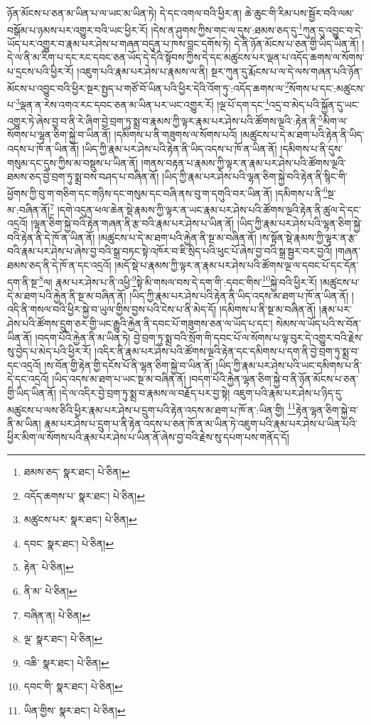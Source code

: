 ཉོན་མོངས་པ་ཅན་མ་ཡིན་པ་ལ་ཡང་མ་ཡིན་ཏེ། དེ་དང་འགལ་བའི་ཕྱིར་ན། ཆེ་ཆུང་གི་རིམ་པས་སྦྱོར་བའི་ལམ་བསྒོམ་པ་ཉམས་པར་འགྱུར་བའི་ཡང་ཕྱིར་རོ། །དེས་ན་ཤུགས་ཀྱིས་གང་ལ་དུས་:ཐམས་ཅད་དུ་\footnote{ཐམས་ཅད་  སྣར་ཐང་།  པེ་ཅིན། }ཀུན་དུ་འབྱུང་བ་དེ་ཡོད་པར་འགྱུར་བ་རྣམ་པར་ཤེས་པ་གཞན་བདུན་པ་ཁས་བླང་དགོས་ཏེ། དེ་ནི་ཉོན་མོངས་པ་ཅན་གྱི་ཡིད་ཡིན་ནོ། །དེ་ལ་ནི་མ་རིག་པ་དང་རང་དབང་ཅན་ཡོད་དེ་དེའི་སྟོབས་ཀྱིས་དེ་དང་མཚུངས་པར་ལྡན་པ་འདོད་ཆགས་ལ་སོགས་པ་དྲངས་པའི་ཕྱིར་རོ། །འཇུག་པའི་རྣམ་པར་ཤེས་པ་རྣམས་ལ་ནི། སྔར་ཀུན་དུ་རྨོངས་པ་ལ་དེ་ལས་གཞན་པའི་ཉོན་མོངས་པ་འབྱུང་བའི་ཕྱིར་སྔར་སྤྱད་པ་གཙོ་བོ་ཡིན་པའི་ཕྱིར་དེའི་འོག་ཏུ་:འདོད་ཆགས་ལ་\footnote{འདོད་ཆགས་པ་  སྣར་ཐང་།  པེ་ཅིན། }སོགས་པ་དང་:མཚུངས་པ་\footnote{མཚུངས་པར་  སྣར་ཐང་།  པེ་ཅིན། }ལྡན་ན་རེས་འགའ་རང་དབང་ཅན་མ་ཡིན་པར་ཡང་འགྱུར་རོ། །ལྔ་པོ་དག་དང་\footnote{དབང་  སྣར་ཐང་།  པེ་ཅིན། }འདྲ་བ་མེད་པའི་སྐྱོན་དུ་ཡང་འགྱུར་ཏེ་ཞེས་བྱ་བ་ནི་རེ་ཞིག་བྱེ་བྲག་ཏུ་སྨྲ་བ་རྣམས་ཀྱི་ལྟར་རྣམ་པར་ཤེས་པའི་ཚོགས་ལྔའི་:རྟེན་ནི་\footnote{རྟེན་  པེ་ཅིན། }མིག་ལ་སོགས་པ་ལྷན་ཅིག་སྐྱེ་བ་ཡིན་ནོ། །དམིགས་པ་ནི་གཟུགས་ལ་སོགས་པའོ། །མཚུངས་པ་དེ་མ་ཐག་པའི་རྟེན་ནི་ཡིད་འདས་པ་ཁོ་ན་ཡིན་ནོ། །ཡིད་ཀྱི་རྣམ་པར་ཤེས་པའི་རྟེན་ནི་ཡིད་འདས་པ་ཁོ་ན་ཡིན་ནོ། །དམིགས་པ་ནི་དུས་གསུམ་དང་དུས་ཀྱིས་མ་བསྡུས་པ་ཡིན་ནོ། །གནས་བརྟན་པ་རྣམས་ཀྱི་ལྟར་ན་རྣམ་པར་ཤེས་པའི་ཚོགས་ལྔའི་ཐམས་ཅད་བྱེ་བྲག་ཏུ་སྨྲ་བས་བཤད་པ་བཞིན་ནོ། །ཡིད་ཀྱི་རྣམ་པར་ཤེས་པའི་ལྷན་ཅིག་སྐྱེ་བའི་རྟེན་ནི་སྙིང་གི་ཕྱོགས་ཀྱི་བུ་ག་གཅིག་དང་གཉིས་དང་གསུམ་དང་བཞི་ནས་བུ་ག་དགུའི་བར་ཡིན་ནོ། །དམིགས་པ་ནི་\footnote{ནི་མ་  པེ་ཅིན། }སྔ་མ་:བཞིན་ནོ།\footnote{བཞིན་ན།  པེ་ཅིན། } །དགེ་འདུན་ཕལ་ཆེན་སྡེ་རྣམས་ཀྱི་ལྟར་ན་ཡང་རྣམ་པར་ཤེས་པའི་ཚོགས་ལྔའི་རྟེན་ནི་ཚུལ་དེ་དང་འདྲའོ། །ལྷན་ཅིག་སྐྱེ་བའི་རྟེན་གཞན་ནི་རྩ་བའི་རྣམ་པར་ཤེས་པ་ཡིན་ནོ། །ཡིད་ཀྱི་རྣམ་པར་ཤེས་པའི་ལྷན་ཅིག་སྐྱེ་བའི་རྟེན་ནི་དེ་ཁོ་ན་ཡིན་ནོ། །མཚུངས་པ་དེ་མ་ཐག་པའི་རྐྱེན་ནི་སྔ་མ་བཞིན་ནོ། །ས་སྟོན་སྡེ་རྣམས་ཀྱི་ལྟར་ན་རྩ་བའི་རྣམ་པར་ཤེས་པ་ཞེས་བྱ་བའི་སྒྲ་བཏང་སྟེ་འཁོར་བ་ཇི་སྲིད་པའི་ཕུང་པོ་ཞེས་བྱ་བའི་སྒྲ་སྦྱར་བར་བྱའོ། །གཞན་ཐམས་ཅད་ནི་དེ་ཁོ་ན་དང་འདྲའོ། །མདོ་སྡེ་པ་རྣམས་ཀྱི་ལྟར་ན་རྣམ་པར་ཤེས་པའི་ཚོགས་ལྔ་ལ་དབང་པོ་དང་དོན་དག་ནི་སྔ་\footnote{ལྔ་  སྣར་ཐང་།  པེ་ཅིན། }ལ། རྣམ་པར་ཤེས་པ་ནི་འཕྱི་\footnote{འཆི་  སྣར་ཐང་།  པེ་ཅིན། }སྟེ་མི་གསལ་བས་དེ་དག་གི་:དབང་གིས་\footnote{དབང་གི་  སྣར་ཐང་།  པེ་ཅིན། }སྐྱེ་བའི་ཕྱིར་རོ། །མཚུངས་པ་དེ་མ་ཐག་པའི་རྐྱེན་ནི་སྔ་མ་བཞིན་ནོ། །ཡིད་ཀྱི་རྣམ་པར་ཤེས་པའི་རྟེན་ནི་ཡིད་འདས་མ་ཐག་པ་ཁོ་ན་ཡིན་ནོ། །འདི་ནི་གསལ་བའི་ཕྱིར་སྐྱེ་བ་ཡུལ་གྱིས་བྱས་པའི་ངེས་པ་ནི་མེད་དོ། །དམིགས་པ་ནི་སྔ་མ་བཞིན་ནོ། །རྣམ་པར་ཤེས་པའི་ཚོགས་དྲུག་ཅར་གྱི་ཡང་རྒྱུའི་རྐྱེན་ནི་དབང་པོ་གཟུགས་ཅན་ལ་ཡོད་པ་དང་། སེམས་ལ་ཡོད་པའི་ས་བོན་ཡིན་ནོ། །བདག་པོའི་རྐྱེན་ནི་མ་ཡིན་ཏེ། བྱེ་བྲག་ཏུ་སྨྲ་བའི་སྲོག་གི་དབང་པོ་ལ་སོགས་པ་ལྟ་བུར་དེ་འགྱུར་བའི་རྗེས་སུ་བྱེད་པ་མེད་པའི་ཕྱིར་རོ། །འདིར་ནི་རྣམ་པར་ཤེས་པའི་ཚོགས་ལྔའི་རྟེན་དང་དམིགས་པ་དག་ནི་བྱེ་བྲག་ཏུ་སྨྲ་བ་དང་འདྲའོ། །ས་བོན་གྱི་རྟེན་གྱི་དངོས་པོ་ནི་ལྷན་ཅིག་སྐྱེ་བ་ཡིན་ནོ། །ཡིད་ཀྱི་རྣམ་པར་ཤེས་པའི་ཡང་དམིགས་པ་ནི་དེ་དང་འདྲའོ། །ཡིད་འདས་མ་ཐག་པ་ཡང་སྔ་མ་བཞིན་ནོ། །བདག་པོའི་རྐྱེན་ལྷན་ཅིག་སྐྱེ་བ་ནི་ཉོན་མོངས་པ་ཅན་གྱི་ཡིད་ཡིན་ནོ། །དེ་ལ་འདིར་བྱེ་བྲག་ཏུ་སྨྲ་བ་རྣམས་ལ་བརྗོད་པར་བྱ་སྟེ། འཇུག་པའི་རྣམ་པར་ཤེས་པ་ཉིད་དུ་མཚུངས་པ་ལས་ཅིའི་ཕྱིར་རྣམ་པར་ཤེས་པ་དྲུག་པའི་རྟེན་འདས་མ་ཐག་པ་ཁོ་ན་:ཡིན་གྱི། \footnote{ཡིན་གྱིས་  སྣར་ཐང་།  པེ་ཅིན། }རྟེན་ལྷན་ཅིག་སྐྱེ་བ་ནི་མ་ཡིན། རྣམ་པར་ཤེས་པ་དྲུག་པ་ནི་རྟེན་འདས་པ་ཅན་ཁོ་ན་མ་ཡིན་ཏེ་འཇུག་པའི་རྣམ་པར་ཤེས་པ་ཡིན་པའི་ཕྱིར་མིག་ལ་སོགས་པའི་རྣམ་པར་ཤེས་པ་ཡིན་ནོ་ཞེས་བྱ་བའི་རྗེས་སུ་དཔག་པས་གནོད་དོ། 